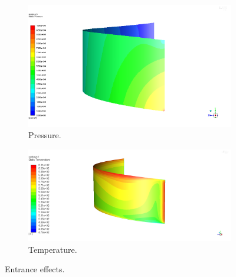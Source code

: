 \documentclass[11pt]{article}
\begin{document}
\begin{figure}[H]
	\centering
	\begin{subfigure}{.5\textwidth}
		\centering
		\includegraphics[width=.9\linewidth, trim={0 0 5cm 0}, clip]{pressure-1}
		\caption{Pressure.}
	\end{subfigure}%
	\begin{subfigure}{.5\textwidth}
		\centering
  		\includegraphics[width=.9\linewidth, trim={0 0 12cm 0}, clip]{temperature-2}
  		\caption{Temperature.}
	\end{subfigure}
	\caption{Entrance effects.}
	\label{fig:entrance}
\end{figure}
\end{document}
